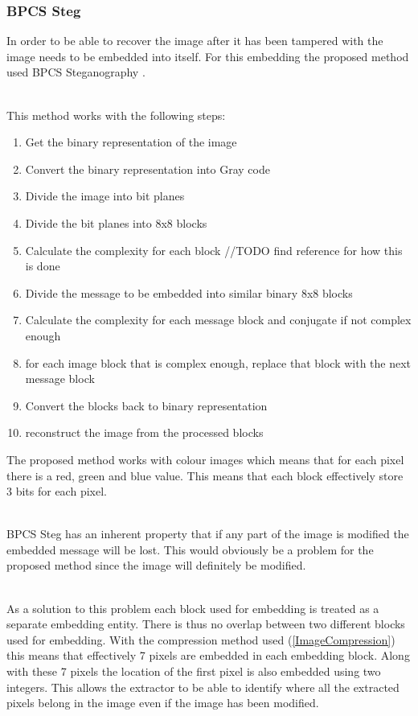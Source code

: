 \documentclass[11pt]{article}
\begin{document}
\subsubsection{BPCS Steg}
\label{bpcsSteg}
In order to be able to recover the image after it has been tampered with the image needs to be embedded into itself. 
For this embedding the proposed method used BPCS Steganography \cite{beaullieubpcs}.

\hspace{0pt} \\
This method works with the following steps:
\begin{enumerate}
  \item Get the binary representation of the image
  \item Convert the binary representation into Gray code
  \item Divide the image into bit planes
  \item Divide the bit planes into 8x8 blocks
  \item Calculate the complexity for each block //TODO find reference for how this is done
  \item Divide the message to be embedded into similar binary 8x8 blocks
  \item Calculate the complexity for each message block and conjugate if not complex enough
  \item for each image block that is complex enough, replace that block with the next message block
  \item Convert the blocks back to binary representation
  \item reconstruct the image from the processed blocks 
\end{enumerate}
The proposed method works with colour images which means that for each pixel there is a red, green and blue value. This means that each block effectively store 3 bits for each pixel. 

\hspace{0pt} \\
BPCS Steg has an inherent property that if any part of the image is modified the embedded message will be lost.
This would obviously be a problem for the proposed method since the image will definitely be modified.

\hspace{0pt} \\
As a solution to this problem each block used for embedding is treated as a separate embedding entity.
There is thus no overlap between two different blocks used for embedding.
With the compression method used (\ref{ImageCompression}) this means that effectively 7 pixels are embedded in each embedding block. Along with these 7 pixels the location of the first pixel is also embedded using two integers.
This allows the extractor to be able to identify where all the extracted pixels belong in the image even if the image has been modified.
\end{document}
